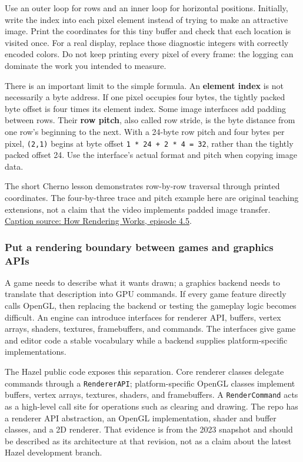 Use an outer loop for rows and an inner loop for horizontal positions. Initially, write the index into each pixel element instead of trying to make an attractive image. Print the coordinates for this tiny buffer and check that each location is visited once. For a real display, replace those diagnostic integers with correctly encoded colors. Do not keep printing every pixel of every frame: the logging can dominate the work you intended to measure.

There is an important limit to the simple formula. An \textbf{element index} is not necessarily a byte address. If one pixel occupies four bytes, the tightly packed byte offset is four times its element index. Some image interfaces add padding between rows. Their \textbf{row pitch}, also called row stride, is the byte distance from one row's beginning to the next. With a 24-byte row pitch and four bytes per pixel, \texttt{(2,1)} begins at byte offset \texttt{1\ *\ 24\ +\ 2\ *\ 4\ =\ 32}, rather than the tightly packed offset 24. Use the interface's actual format and pitch when copying image data.

The short Cherno lesson demonstrates row-by-row traversal through printed coordinates. The four-by-three trace and pitch example here are original teaching extensions, not a claim that the video implements padded image transfer. \href{https://www.youtube.com/watch?v=6dOIju7--Jg}{Caption source: How Rendering Works, episode 4.5}.

\subsubsection{Put a rendering boundary between games and graphics APIs}\label{put-a-rendering-boundary-between-games-and-graphics-apis}

A game needs to describe what it wants drawn; a graphics backend needs to translate that description into GPU commands. If every game feature directly calls OpenGL, then replacing the backend or testing the gameplay logic becomes difficult. An engine can introduce interfaces for renderer API, buffers, vertex arrays, shaders, textures, framebuffers, and commands. The interfaces give game and editor code a stable vocabulary while a backend supplies platform-specific implementations.

The Hazel public code exposes this separation. Core renderer classes delegate commands through a \texttt{RendererAPI}; platform-specific OpenGL classes implement buffers, vertex arrays, textures, shaders, and framebuffers. A \texttt{RenderCommand} acts as a high-level call site for operations such as clearing and drawing. The repo has a renderer API abstraction, an OpenGL implementation, shader and buffer classes, and a 2D renderer. That evidence is from the 2023 snapshot and should be described as its architecture at that revision, not as a claim about the latest Hazel development branch.

